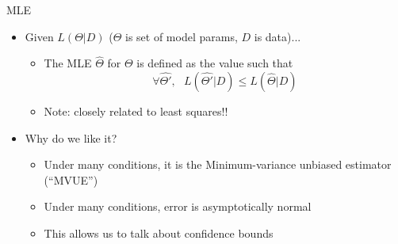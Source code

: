 \documentclass[aspectratio=169]{beamer}
\begin{document}
\begin{frame}{MLE}

\begin{itemize}
\item Given $L(\Theta | D)$ ($\Theta$ is set of model params, $D$ is data)...
	\begin{itemize}
	\item The MLE $\hat{\Theta}$ for $\Theta$ is defined as the value such that
		$$\forall \hat{\Theta'}, \textrm{ } L(\hat{\Theta'} | D) \leq L(\hat{\Theta} | D)$$
	\item Note: closely related to least squares!!
	\end{itemize}
\item Why do we like it?
	\begin{itemize}
	\item Under many conditions, it is the Minimum-variance unbiased estimator (``MVUE'')
	\item Under many conditions, error is asymptotically normal
	\item This allows us to talk about confidence bounds
	\end{itemize}
\end{itemize}
\end{frame}
\end{document}
